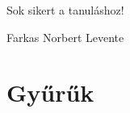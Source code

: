 \documentclass[12pt]{book}
\theoremstyle{plain} %
\theoremstyle{definition} %
\theoremstyle{remark}
\numberwithin{equation}{section}  %
\renewcommand{\chaptermark}[1]{\markboth{\thechapter.\ \MakeUppercase{#1}}{}} %
\begin{document}
	
	
	Sok sikert a tanuláshoz!
	
	Farkas Norbert Levente
	\newpage

	\chapter{Gyűrűk}
	\pagestyle{fancy}
	\renewcommand{\chaptermark}[1]{\markboth{\thechapter.\ \MakeUppercase{#1}}{}} %
	\fancyhf{}
	\fancyhead[LE]{\thepage}
	\fancyhead[RO]{\thepage}
	\fancyhead[LO]{\rightmark}
	\fancyhead[RE]{\leftmark}
	
\end{document}
